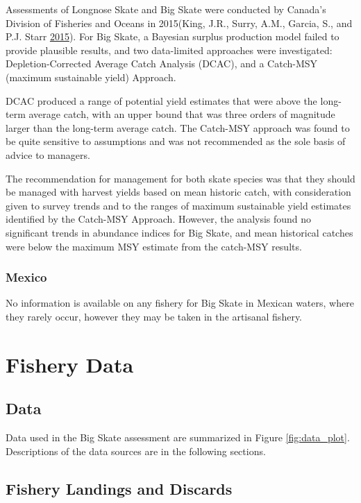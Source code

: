\documentclass[12pt,]{article}
\begin{document}
Assessments of Longnose Skate and Big Skate were conducted by Canada's
Division of Fisheries and Oceans in 2015(King, J.R., Surry, A.M.,
Garcia, S., and P.J. Starr \protect\hyperlink{ref-King2015}{2015}). For
Big Skate, a Bayesian surplus production model failed to provide
plausible results, and two data-limited approaches were investigated:
Depletion-Corrected Average Catch Analysis (DCAC), and a Catch-MSY
(maximum sustainable yield) Approach.

DCAC produced a range of potential yield estimates that were above the
long-term average catch, with an upper bound that was three orders of
magnitude larger than the long-term average catch. The Catch-MSY
approach was found to be quite sensitive to assumptions and was not
recommended as the sole basis of advice to managers.

The recommendation for management for both skate species was that they
should be managed with harvest yields based on mean historic catch, with
consideration given to survey trends and to the ranges of maximum
sustainable yield estimates identified by the Catch-MSY Approach.
However, the analysis found no significant trends in abundance indices
for Big Skate, and mean historical catches were below the maximum MSY
estimate from the catch-MSY results.

\hypertarget{mexico}{%
\subsubsection{Mexico}\label{mexico}}

No information is available on any fishery for Big Skate in Mexican
waters, where they rarely occur, however they may be taken in the
artisanal fishery.

\newpage

\hypertarget{fishery-data}{%
\section{Fishery Data}\label{fishery-data}}

\hypertarget{data}{%
\subsection{Data}\label{data}}

Data used in the Big Skate assessment are summarized in Figure
\ref{fig:data_plot}. Descriptions of the data sources are in the
following sections.

\hypertarget{fishery-landings-and-discards}{%
\subsection{Fishery Landings and
Discards}\label{fishery-landings-and-discards}}
\end{document}
